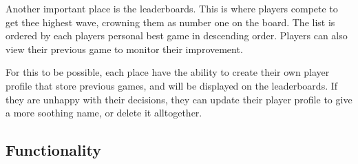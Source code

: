 \documentclass[12pt]{article}
\begin{document}
    Another important place is the leaderboards. This is where players compete to get thee highest wave, crowning them as number one on the board. The list is ordered by each players personal best game in descending order. Players can also view their previous game to monitor their improvement.

    For this to be possible, each place have the ability to create their own player profile that store previous games, and will be displayed on the leaderboards. If they are unhappy with their decisions, they can update their player profile to give a more soothing name, or delete it alltogether.

    \subsection{Functionality}

    
\end{document}
